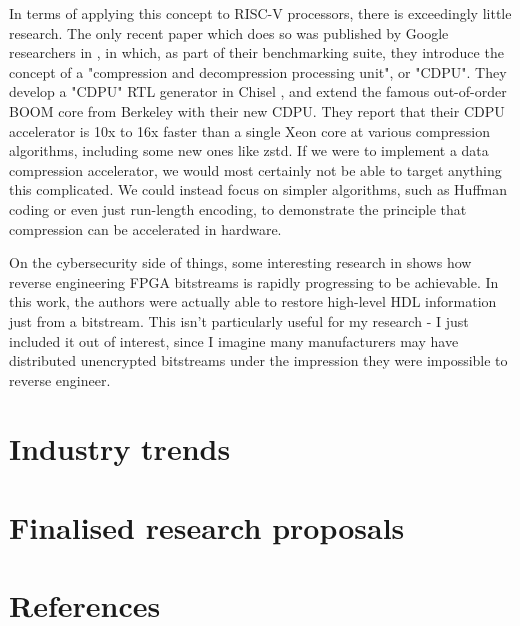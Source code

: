 \documentclass[12pt]{article}
\begin{document}
In terms of applying this concept to RISC-V processors, there is exceedingly little research. The only recent
paper which does so was published by Google researchers in \cite{Karandikar2023}, in which, as part of their
benchmarking suite, they introduce the concept of a "compression and decompression processing unit", or "CDPU".
They develop a "CDPU" RTL generator in Chisel \cite{Chisel}, and extend the famous out-of-order BOOM core
\cite{Asanovi2015TheBO} from Berkeley with their new CDPU. They report that their CDPU accelerator is 10x
to 16x faster than a single Xeon core at various compression algorithms, including some new ones like zstd.
If we were to implement a data compression accelerator, we would most certainly not be able to target anything
this complicated. We could instead focus on simpler algorithms, such as Huffman coding or even just
run-length encoding, to demonstrate the principle that compression can be accelerated in hardware.

On the cybersecurity side of things, some interesting research in \cite{McKendrick2022} shows how reverse
engineering FPGA bitstreams is rapidly progressing to be achievable. In this work, the authors were actually
able to restore high-level HDL information just from a bitstream. This isn't particularly useful for my
research - I just included it out of interest, since I imagine many manufacturers may have distributed 
unencrypted bitstreams under the impression they were impossible to reverse engineer.

\section{Industry trends}

\section{Finalised research proposals}

\section{References}
\printbibliography[heading=none]
\end{document}
